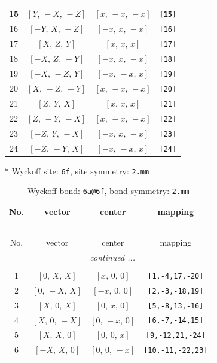 \documentclass[fleqn,8pt]{jsarticle}
\begin{document}
\begin{longtable}{cccc}
15 & $\left[ Y,\, - X,\, - Z \right]$ & $\left[ x,\, - x,\, - x \right]$ & {\tt [15]} \\ \hline
16 & $\left[ - Y,\, X,\, - Z \right]$ & $\left[ - x,\, x,\, - x \right]$ & {\tt [16]} \\ \hline
17 & $\left[ X,\, Z,\, Y \right]$ & $\left[ x,\, x,\, x \right]$ & {\tt [17]} \\ \hline
18 & $\left[ - X,\, Z,\, - Y \right]$ & $\left[ - x,\, x,\, - x \right]$ & {\tt [18]} \\ \hline
19 & $\left[ - X,\, - Z,\, Y \right]$ & $\left[ - x,\, - x,\, x \right]$ & {\tt [19]} \\ \hline
20 & $\left[ X,\, - Z,\, - Y \right]$ & $\left[ x,\, - x,\, - x \right]$ & {\tt [20]} \\ \hline
21 & $\left[ Z,\, Y,\, X \right]$ & $\left[ x,\, x,\, x \right]$ & {\tt [21]} \\ \hline
22 & $\left[ Z,\, - Y,\, - X \right]$ & $\left[ x,\, - x,\, - x \right]$ & {\tt [22]} \\ \hline
23 & $\left[ - Z,\, Y,\, - X \right]$ & $\left[ - x,\, x,\, - x \right]$ & {\tt [23]} \\ \hline
24 & $\left[ - Z,\, - Y,\, X \right]$ & $\left[ - x,\, - x,\, x \right]$ & {\tt [24]} \\
\end{longtable}
* Wyckoff site: {\tt 6f}, site symmetry: {\tt 2.mm}
\renewcommand{\arraystretch}{1.2}
\begin{longtable}{cccc}
\caption{Wyckoff bond: {\tt 6a@6f}, bond symmetry: {\tt 2.mm}}
 \\
 \hline \hline
No. & vector & center & mapping \\ \hline \endfirsthead

\multicolumn{3}{l}{\tablename\ \thetable{}} \\
 \hline \hline
No. & vector & center & mapping \\ \hline \endhead

 \hline \hline
\multicolumn{3}{r}{\footnotesize\it continued ...} \\ \endfoot

 \hline \hline
\multicolumn{3}{r}{} \\ \endlastfoot

1 & $\left[ 0,\, X,\, X \right]$ & $\left[ x,\, 0,\, 0 \right]$ & {\tt [1,-4,17,-20]} \\ \hline
2 & $\left[ 0,\, - X,\, X \right]$ & $\left[ - x,\, 0,\, 0 \right]$ & {\tt [2,-3,-18,19]} \\ \hline
3 & $\left[ X,\, 0,\, X \right]$ & $\left[ 0,\, x,\, 0 \right]$ & {\tt [5,-8,13,-16]} \\ \hline
4 & $\left[ X,\, 0,\, - X \right]$ & $\left[ 0,\, - x,\, 0 \right]$ & {\tt [6,-7,-14,15]} \\ \hline
5 & $\left[ X,\, X,\, 0 \right]$ & $\left[ 0,\, 0,\, x \right]$ & {\tt [9,-12,21,-24]} \\ \hline
6 & $\left[ - X,\, X,\, 0 \right]$ & $\left[ 0,\, 0,\, - x \right]$ & {\tt [10,-11,-22,23]} \\
\end{longtable}
\end{document}
